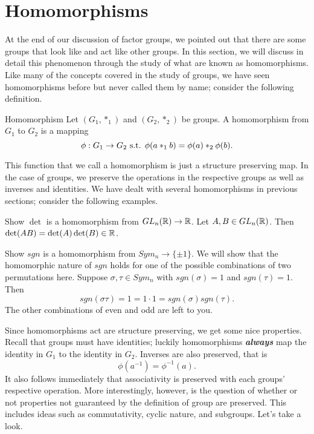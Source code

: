 \section{Homomorphisms}

At the end of our discussion of factor groups, we pointed out that there are some groups that look like and act like other groups.
In this section, we will discuss in detail this phenomenon through the study of what are known as homomorphisms.
Like many of the concepts covered in the study of groups, we have seen homomorphisms before but never called them by name; consider the following definition.

\begin{definition}{Homomorphism}
    Let $(G_{1},*_{1})$ and $(G_{2},*_{2})$ be groups. A homomorphism from $G_{1}$ to $G_{2}$ is a mapping
    \[
        \phi: G_{1}\to G_{2}\text{ s.t. } \phi(a*_{1}b)=\phi(a)*_{2}\phi(b).
    \]
\end{definition}
This function that we call a homomorphism is just a structure preserving map.
In the case of groups, we preserve the operations in the respective groups as well as inverses and identities.
We have dealt with several homomorphisms in previous sections; consider the following examples.

\begin{example}{Show $\det$ is a homomorphism from $GL_{n}(\mathbb{R})\to\mathbb{R}$.}
    Let $A,B\in GL_{n}(\mathbb{R})$. Then $\det(AB)=\det(A)\det(B)\in\mathbb{R}$.
\end{example}

\begin{example}{Show $sgn$ is a homomorphism from $Sym_{n}\to\{\pm1\}$.}
    We will show that the homomorphic nature of $sgn$ holds for one of the possible combinations of two permutations here.
    Suppose $\sigma,\tau\in Sym_{n}$ with $sgn(\sigma)=1$ and $sgn(\tau)=1$. Then
    \[
        sgn(\sigma\tau)=1=1\cdot 1=sgn(\sigma)sgn(\tau).
    \]
    The other combinations of even and odd are left to you.
\end{example}

Since homomorphisms act are structure preserving, we get some nice properties.
Recall that groups must have identities; luckily homomorphisms \textit{\textbf{always}} map the identity in $G_{1}$ to the identity in $G_{2}$.
Inverses are also preserved, that is
\[
    \phi(a^{-1})=\phi^{-1}(a).
\]
It also follows immediately that associativity is preserved with each groups' respective operation.
More interestingly, however, is the question of whether or not properties not guaranteed by the definition of group are preserved.
This includes ideas such as commutativity, cyclic nature, and subgroups.
Let's take a look.

